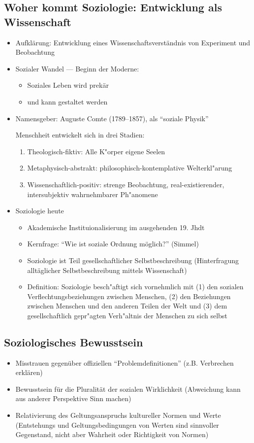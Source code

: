 \subsection{Woher kommt Soziologie: Entwicklung als Wissenschaft}
\begin{itemize}
	\item
		Aufklärung: Entwicklung eines Wissenschaftsverständnis von Experiment und Beobachtung
	\item
		Sozialer Wandel --- Beginn der Moderne:
		\begin{itemize}
			\item
				Soziales Leben wird prekär
			\item
				und kann gestaltet werden
		\end{itemize}
	\item
		Namensgeber: Auguste Comte (1789--1857), als \enquote{soziale Physik}
		
		Menschheit entwickelt sich in drei Stadien:
		\begin{enumerate}
			\item
				Theologisch-fiktiv: Alle K"orper eigene Seelen
			\item
				Metaphysisch-abstrakt: philosophisch-kontemplative Welterkl"arung
			\item
				Wissenschaftlich-positiv: strenge Beobachtung, real-existierender, intersubjektiv wahrnehmbarer Ph"anomene
		\end{enumerate}
	\item
		Soziologie heute
		\begin{itemize}
			\item
				Akademische Instituionalisierung im ausgehenden 19. Jhdt
			\item
				Kernfrage: \enquote{Wie ist soziale Ordnung möglich?} (Simmel)
			\item
				Soziologie ist Teil gesellschaftlicher Selbstbeschreibung (Hinterfragung all\-täg\-licher Selbstbeschreibung mittels Wissenschaft)
			\item
				Definition: Soziologie besch"aftigt sich vornehmlich mit (1) den sozialen Verflechtungsbeziehungen zwischen Menschen, (2) den Beziehungen zwischen Menschen und den anderen Teilen der Welt und (3) dem gesellschaftlich gepr"agten Verh"altnis der Menschen zu sich selbst
		\end{itemize}
\end{itemize}

\subsection{Soziologisches Bewusstsein}
\begin{itemize}
	\item
		Misstrauen gegenüber offiziellen \enquote{Problemdefinitionen} (z.B. Verbrechen erklären)
	\item
		Bewusstsein für die Pluralität der sozialen Wirklichkeit (Abweichung kann aus anderer Perspektive Sinn machen)
	\item
		Relativierung des Geltungsanspruchs kultureller Normen und Werte (Entstehungs und Geltungsbedingungen von Werten sind sinnvoller Gegenstand, nicht aber Wahrheit oder Richtigkeit von Normen)
\end{itemize}
